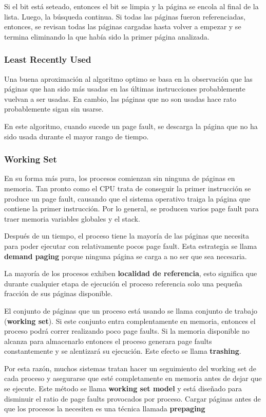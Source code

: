 Si el bit está seteado, entonces el bit se limpia y la página se encola al final de la lista. Luego, la búsqueda continua. Si todas las páginas fueron referenciadas, entonces, se revisan todas las páginas cargadas hasta volver a empezar y se termina eliminando la que había sido la primer página analizada.

\subsubsection{Least Recently Used}
Una buena aproximación al algoritmo optimo se basa en la observación que las páginas que han sido más usadas en las últimas instrucciones probablemente vuelvan a ser usadas. En cambio, las páginas que no son usadas hace rato probablemente sigan sin usarse.

En este algoritmo, cuando sucede un page fault, se descarga la página que no ha sido usada durante el mayor rango de tiempo.

\subsubsection{Working Set}
En su forma más pura, los procesos comienzan sin ninguna de páginas en memoria. Tan pronto como el CPU trata de conseguir la primer instrucción se produce un page fault, causando que el sistema operativo traiga la página que contiene la primer instrucción. Por lo general, se producen varios page fault para traer memoria variables globales y el stack. 

Después de un tiempo, el proceso tiene la mayoría de las páginas que necesita para poder ejecutar con relativamente pocos page fault. Esta estrategia se llama \textbf{demand paging} porque ninguna página se carga a no ser que sea necesaria.

La mayoría de los procesos exhiben \textbf{localidad de referencia}, esto significa que durante cualquier etapa de ejecución el proceso referencia solo una pequeña fracción de sus páginas disponible. 

El conjunto de páginas que un proceso está usando se llama conjunto de trabajo (\textbf{working set}). Si este conjunto entra complentamente en memoria, entonces el proceso podrá correr realizando poco page faults. Si la memoria disponible no alcanza para almacenarlo entonces el proceso generara page faults constantemente y se alentizará su ejecución. Este efecto se llama \textbf{trashing}.

Por esta razón, muchos sistemas tratan hacer un seguimiento del working set de cada proceso y asegurarse que esté completamente en memoria antes de dejar que se ejecute. Este método se llama \textbf{working set model} y está diseñado para disminuir el ratio de page faults provocados por proceso. Cargar páginas antes de que los procesos la necesiten es una técnica llamada \textbf{prepaging}

